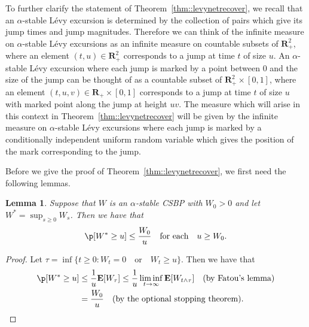 \documentclass[JEP,XML,SOM,Unicode]{cedram}
\theoremstyle{plain}
\numberwithin{theorem}{section}
\newtheorem{lemma}[theorem]{Lemma}
\theoremstyle{definition}
\newcommand \E {{\mathbf E}}
\newcommand{\R}{\mathbf{R}}
\begin{document}
To further clarify the statement of Theorem~\ref{thm::levynetrecover}, we recall that an $\alpha$-stable Lévy excursion is determined by the collection of pairs which give its jump times and jump magnitudes. Therefore we can think of the infinite measure on $\alpha$-stable Lévy excursions as an infinite measure on countable subsets of $\R_+^2$, where an element $(t,u) \in \R_+^2$ corresponds to a jump at time $t$ of size $u$. An $\alpha$-stable Lévy excursion where each jump is marked by a point between $0$ and the size of the jump can be thought of as a countable subset of $\R_+^2 \times [0,1]$, where an element $(t,u,v) \in \R_+ \times [0,1]$ corresponds to a jump at time $t$ of size $u$ with marked point along the jump at height $uv$. The measure which will arise in this context in Theorem~\ref{thm::levynetrecover} will be given by the infinite measure on $\alpha$-stable Lévy excursions where each jump is marked by a conditionally independent uniform random variable which gives the position of the mark corresponding to the jump.

Before we give the proof of Theorem~\ref{thm::levynetrecover}, we first need the following lemmas.

\begin{lemma}
\label{lem::csbp_sup}
Suppose that $W$ is an $\alpha$-stable CSBP with $W_0 > 0$ and let $W^* = \sup_{s \geq 0} W_s$. Then we have that
\begin{equation}
\label{eqn::csbp_sup_bound}
\p[ W^* \geq u] \leq \frac{W_0}{u} \quad\text{for each}\quad u \geq W_0.
\end{equation}
\end{lemma}
\begin{proof}
Let $\tau = \inf\{t \geq 0: W_t = 0 \quad\text{or}\quad W_t \geq u\}$. Then we have that
\begin{align*}
\p[ W^* \geq u ]
&\leq \frac{1}{u} \E[ W_\tau ] \leq \frac{1}{u} \liminf_{t \to \infty} \E[ W_{t \wedge \tau}] \quad\text{(by Fatou's lemma)}\\
&= \frac{W_0}{u} \quad\text{(by the optional stopping theorem)}.\qedhere	
\end{align*}
\end{proof}
\end{document}
